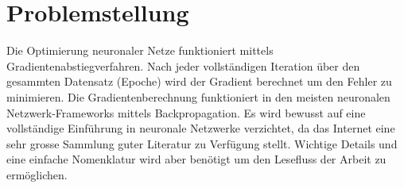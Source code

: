 %
%
%
\section{Problemstellung
\label{ableitung:section:problemstellung}}
Die Optimierung neuronaler Netze funktioniert mittels Gradientenabstiegverfahren.
Nach jeder vollständigen Iteration über den gesammten Datensatz (Epoche) wird der Gradient berechnet um den Fehler zu minimieren. Die Gradientenberechnung funktioniert in den meisten neuronalen Netzwerk-Frameworks mittels Backpropagation.
Es wird bewusst auf eine vollständige Einführung in neuronale Netzwerke verzichtet, da das Internet eine sehr grosse Sammlung guter Literatur zu Verfügung stellt. 
Wichtige Details und eine einfache Nomenklatur wird aber benötigt um den Lesefluss der Arbeit zu ermöglichen.

